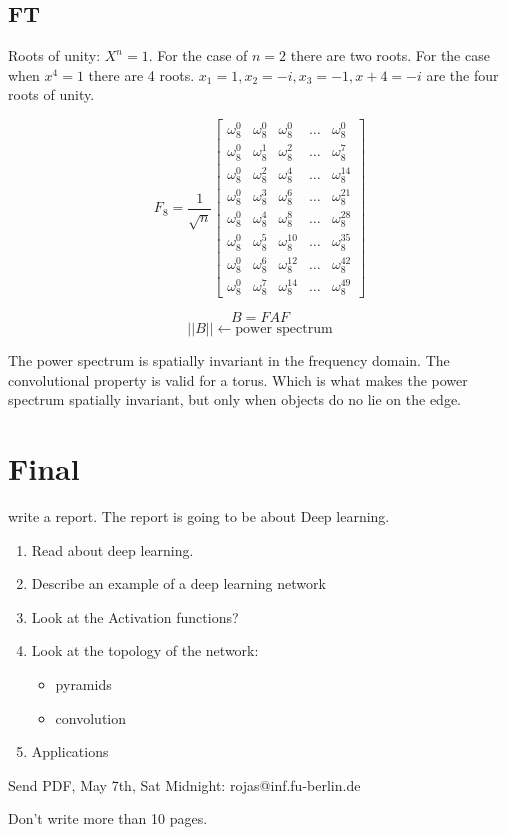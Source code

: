 \documentclass[letterpaper, 9pt]{article}
\begin{document}
\subsection{FT}
Roots of unity: $X^n = 1$. For the case of $n=2$ there are two roots. For the case when $x^4=1$ there are 4 roots. $x_1=1,x_2=-i,x_3=-1,x+4=-i$ are the four roots of unity.

\begin{equation}
F_8 = \frac{1}{\sqrt{n}}
\begin{bmatrix}
\omega_8^0 & \omega_8^0 & \omega_8^0 & \dots & \omega_8^0 \\
\omega_8^0 & \omega_8^1 & \omega_8^2 & \dots & \omega_8^7 \\
\omega_8^0 & \omega_8^2 & \omega_8^4 & \dots & \omega_8^14 \\
\omega_8^0 & \omega_8^3 & \omega_8^6 & \dots & \omega_8^21 \\
\omega_8^0 & \omega_8^4 & \omega_8^8 & \dots & \omega_8^28 \\
\omega_8^0 & \omega_8^5 & \omega_8^10 & \dots & \omega_8^35 \\
\omega_8^0 & \omega_8^6 & \omega_8^12 & \dots & \omega_8^42 \\
\omega_8^0 & \omega_8^7 & \omega_8^14 & \dots & \omega_8^49
\end{bmatrix}
\end{equation}

\begin{equation}
B = FAF
\end{equation}
\begin{equation}
||B|| \leftarrow \text{power spectrum}
\end{equation}


The power spectrum is spatially invariant in the frequency domain. The convolutional property is valid for a torus. Which is what makes the power spectrum spatially invariant, but only when objects do no lie on the edge.

\section{Final}
write a report. The report is going to be about Deep learning.
\begin{enumerate}
\item Read about deep learning.
\item Describe an example of a deep learning network
\item Look at the Activation functions?
\item Look at the topology of the network:
\begin{itemize}
\item pyramids
\item convolution
\end{itemize}
\item Applications
\end{enumerate}

Send PDF, May 7th, Sat Midnight: rojas@inf.fu-berlin.de

Don't write more than 10 pages.
\end{document}
